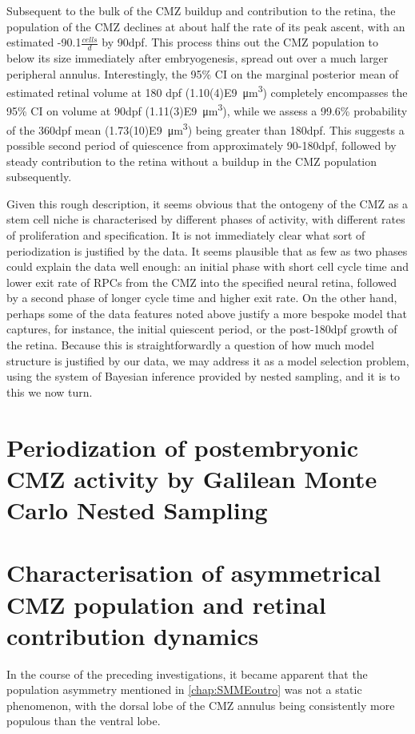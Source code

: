 Subsequent to the bulk of the CMZ buildup and contribution to the retina, the population of the CMZ declines at about half the rate of its peak ascent, with an estimated -90.1$\frac{cells}{d}$ by 90dpf. This process thins out the CMZ population to below its size immediately after embryogenesis, spread out over a much larger peripheral annulus. Interestingly, the 95\% CI on the marginal posterior mean of estimated retinal volume at 180 dpf (\SI{1.10(4)E9}{\cubic\micro\metre}) completely encompasses the 95\% CI on volume at 90dpf (\SI{1.11(3)E9}{\cubic\micro\metre}), while we assess a 99.6\% probability of the 360dpf mean (\SI{1.73(10)E9}{\cubic\micro\metre}) being greater than 180dpf. This suggests a possible second period of quiescence from approximately 90-180dpf, followed by steady contribution to the retina without a buildup in the CMZ population subsequently.

Given this rough description, it seems obvious that the ontogeny of the CMZ as a stem cell niche is characterised by different phases of activity, with different rates of proliferation and specification. It is not immediately clear what sort of periodization is justified by the data. It seems plausible that as few as two phases could explain the data well enough: an initial phase with short cell cycle time and lower exit rate of RPCs from the CMZ into the specified neural retina, followed by a second phase of longer cycle time and higher exit rate. On the other hand, perhaps some of the data features noted above justify a more bespoke model that captures, for instance, the initial quiescent period, or the post-180dpf growth of the retina. Because this is straightforwardly a question of how much model structure is justified by our data, we may address it as a model selection problem, using the system of Bayesian inference provided by nested sampling, and it is to this we now turn.

\section{Periodization of postembryonic CMZ activity by Galilean Monte Carlo Nested Sampling}


\section{Characterisation of asymmetrical CMZ population and retinal contribution dynamics}

In the course of the preceding investigations, it became apparent that the population asymmetry mentioned in \autoref{chap:SMMEoutro} was not a static phenomenon, with the dorsal lobe of the CMZ annulus being consistently more populous than the ventral lobe. 

